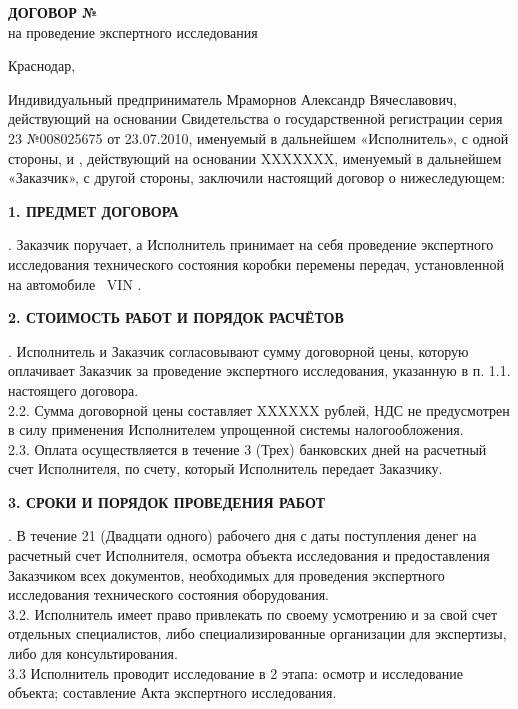 \begin{center}
    	\textbf{{\large  ДОГОВОР № \NomerDoc}}\\
    	 на проведение экспертного исследования
    	 \vspace{-6mm}
    \end{center}
\vspace{-6mm}
\begin{flushright}
		\hfill	Краснодар, \dog    \\[8mm]
\end{flushright} 
\vspace{-6mm}
Индивидуальный предприниматель Мраморнов Александр Вячеславович, действующий на основании Свидетельства о государственной регистрации серия 23 №008025675 от 23.07.2010, именуемый в дальнейшем «Исполнитель», с одной стороны, и , действующий на основании {XXXXXXX}, именуемый в дальнейшем «Заказчик», с другой стороны, заключили настоящий договор о нижеследующем:

         
\begin{center}
	\textbf{1. ПРЕДМЕТ ДОГОВОРА}
\end{center}
\vspace{-3mm}
 . Заказчик поручает, а Исполнитель принимает на себя проведение экспертного исследования технического состояния коробки перемены передач,  установленной на автомобиле  \, VIN \vin.


\begin{center}
	\textbf{2. СТОИМОСТЬ РАБОТ И ПОРЯДОК РАСЧЁТОВ}
\end{center}
\vspace{-3mm}
 . Исполнитель и Заказчик согласовывают сумму договорной цены, которую оплачивает Заказчик   за проведение экспертного исследования, указанную в п. 1.1. настоящего договора.\\ 
2.2. Сумма договорной цены составляет {XXXXXX} рублей, НДС не предусмотрен в силу применения Исполнителем упрощенной системы налогообложения.\\
2.3. Оплата осуществляется в течение 3 (Трех) банковских дней на расчетный счет Исполнителя, по счету, который Исполнитель передает Заказчику.



\begin{center}
	\textbf{3. СРОКИ И ПОРЯДОК ПРОВЕДЕНИЯ РАБОТ}
\end{center}
\vspace{-3mm}
 . В течение 21 (Двадцати одного) рабочего дня с даты поступления денег на расчетный счет
Исполнителя, осмотра объекта исследования и предоставления Заказчиком всех документов,
необходимых для проведения экспертного исследования технического состояния оборудования.\\
3.2. Исполнитель имеет право привлекать по своему усмотрению и за свой счет отдельных 
специалистов, либо специализированные организации для экспертизы, либо для консультирования.\\
3.3 Исполнитель проводит исследование в 2 этапа: осмотр и исследование объекта; составление Акта экспертного исследования.

